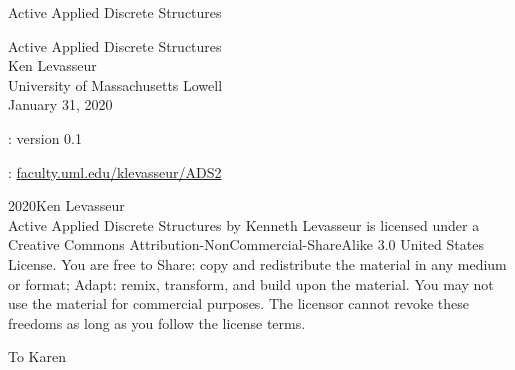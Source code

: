 \documentclass[oneside,10pt,]{book}
\numberwithin{equation}{section}
\begin{document}
\frontmatter
\thispagestyle{empty}
{\centering
\vspace*{0.28\textheight}
{\Huge Active Applied Discrete Structures}\\}
\clearpage
\thispagestyle{empty}
\null%
\clearpage
\thispagestyle{empty}
{\centering
\vspace*{0.14\textheight}
{\Huge Active Applied Discrete Structures}\\[3\baselineskip]
{\Large Ken Levasseur}\\[0.5\baselineskip]
{\Large University of Massachusetts Lowell}\\[3\baselineskip]
{\Large January 31, 2020}\\}
\clearpage
\thispagestyle{empty}
\hypertarget{g:colophon:idm365633817072}{}
: version 0.1\par\medskip
{}: \href{http:\slash{}\slash{}faculty.uml.edu\slash{}klevasseur\slash{}ADS2}{faculty.uml.edu\slash{}klevasseur\slash{}ADS2}\par\medskip
\noindent\textcopyright{}2020\quad{}Ken Levasseur\\[0.5\baselineskip]
Active Applied Discrete Structures by Kenneth Levasseur is licensed under a Creative Commons Attribution-NonCommercial-ShareAlike 3.0 United States License. You are free to Share: copy and redistribute the material in any medium or format; Adapt: remix, transform, and build upon the material. You may not use the material for commercial purposes.  The licensor cannot revoke these freedoms as long as you follow the license terms.\par\medskip
{}
\null\clearpage
\cleardoublepage
\thispagestyle{empty}
\begin{center}\Large%
To Karen%
\end{center}
\clearpage
\thispagestyle{empty}
\null%
\clearpage
\end{document}
